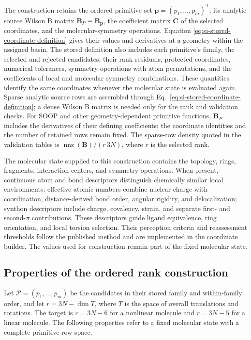 \documentclass[10pt]{article}
\newcommand{\Bmat}{\mathbf{B}}
\begin{document}
{The construction retains the ordered primitive set
\(\mathbf p=(p_1,\ldots,p_m)^{\mathsf T}\), its analytic source Wilson B
matrix \(\Bmat_P\equiv\Bmat_{\mathbf p}\), the coefficient matrix \(\mathbf C\) of the
selected coordinates, and the molecular-symmetry operations. Equation
\ref{eq:si-stored-coordinate-definition} gives their values and derivatives
at a geometry within the assigned basin.}
{The stored definition also includes each primitive's family,
the selected and rejected candidates, their rank residuals, protected
coordinates, numerical tolerances, symmetry operations with atom
permutations, and the coefficients of local and molecular symmetry
combinations. These quantities identify the same coordinates whenever the
molecular state is evaluated again. Sparse analytic source rows are assembled
through Eq.~\ref{eq:si-stored-coordinate-definition}; a dense Wilson B matrix
is needed only for the rank and validation checks.}
{For SOOP and other geometry-dependent primitive functions,
\(\Bmat_P\) includes the derivatives of their defining coefficients; the
coordinate identities and the number of retained rows remain fixed. The
sparse-row density quoted in the validation tables is
\(\operatorname{nnz}(\Bmat)/(r\,3N)\), where \(r\) is the selected rank.}

{The molecular state supplied to this construction contains the
topology, rings, fragments, interaction centers, and symmetry operations.
When present, continuous atom and bond descriptors distinguish chemically
similar local environments: effective atomic numbers combine nuclear charge
with coordination, distance-derived bond order, angular rigidity, and
delocalization; synthon descriptors include charge, covalency, strain, and
separate first- and second-\(\pi\) contributions. These descriptors guide
ligand equivalence, ring orientation, and local torsion selection. Their
perception criteria and reassessment thresholds follow the published method\cite{Barone2026Perception}
and are implemented in the coordinate builder. The values used for construction remain part of
the fixed molecular state.}

\subsection{Properties of the ordered rank construction}

{Let \(\mathcal P=(p_1,\ldots,p_m)\) be the candidates in their
stored family and within-family order, and let \(r=3N-\dim T\), where
\(T\) is the space of overall translations and rotations. The target is
\(r=3N-6\) for a nonlinear molecule and \(r=3N-5\) for a linear molecule.
The following properties refer to a fixed molecular state with a complete
primitive row space.}
\end{document}
